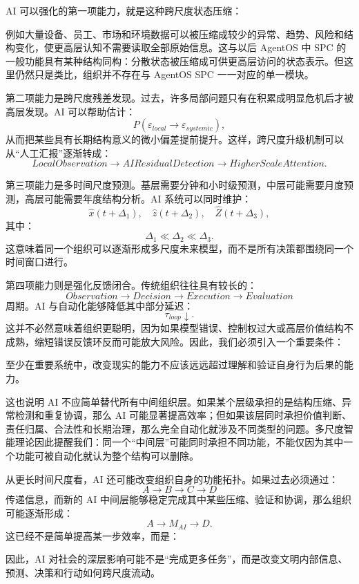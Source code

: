 AI 可以强化的第一项能力，就是这种跨尺度状态压缩：
\begin{statementbox}
\centering
{}
\end{statementbox}
例如大量设备、员工、市场和环境数据可以被压缩成较少的异常、趋势、风险和结构变化，使更高层认知不需要读取全部原始信息。这与以后 AgentOS 中 SPC 的一般功能具有某种结构同构：分散状态被压缩成可供更高层访问的状态表示。但这里仍然只是类比，组织并不存在与 AgentOS SPC 一一对应的单一模块。

第二项能力是跨尺度残差发现。过去，许多局部问题只有在积累成明显危机后才被高层发现。AI 可以帮助估计：
\[
P
\left(
\varepsilon_{local}
\rightarrow
\varepsilon_{systemic}
\right),
\]
从而把某些具有长期结构意义的微小偏差提前提升。这样，跨尺度升级机制可以从“人工汇报”逐渐转成：
\[
LocalObservation
\rightarrow
AIResidualDetection
\rightarrow
HigherScaleAttention.
\]

第三项能力是多时间尺度预测。基层需要分钟和小时级预测，中层可能需要月度预测，高层可能需要年度结构分析。AI 系统可以同时维护：
\[
\hat x(t+\Delta_1),
\quad
\hat z(t+\Delta_2),
\quad
\hat Z(t+\Delta_3),
\]
其中：
\[
\Delta_1
\ll
\Delta_2
\ll
\Delta_3.
\]
这意味着同一个组织可以逐渐形成多尺度未来模型，而不是所有决策都围绕同一个时间窗口进行。

第四项能力则是强化反馈闭合。传统组织往往具有较长的：
\[
Observation
\rightarrow
Decision
\rightarrow
Execution
\rightarrow
Evaluation
\]
周期。AI 与自动化能够降低其中部分延迟：
\[
\tau_{loop}\downarrow.
\]
这并不必然意味着组织更聪明，因为如果模型错误、控制权过大或高层价值结构不成熟，缩短错误反馈环反而可能放大风险。因此，我们必须引入一个重要条件：
\begin{statementbox}
\centering
{}
\end{statementbox}
至少在重要系统中，改变现实的能力不应该远远超过理解和验证自身行为后果的能力。

这也说明 AI 不应简单替代所有中间组织层。如果某个层级承担的是结构压缩、异常检测和重复协调，那么 AI 可能显著提高效率；但如果该层同时承担价值判断、责任归属、合法性和长期治理，那么完全自动化就涉及不同类型的问题。多尺度智能理论因此提醒我们：同一个“中间层”可能同时承担不同功能，不能仅因为其中一个功能可被自动化就认为整个结构可以删除。

从更长时间尺度看，AI 还可能改变组织自身的功能拓扑。如果过去必须通过：
\[
A\rightarrow B\rightarrow C\rightarrow D
\]
传递信息，而新的 AI 中间层能够稳定完成其中某些压缩、验证和协调，那么组织可能逐渐形成：
\[
A\rightarrow M_{AI}\rightarrow D.
\]
这已经不是简单提高某一步效率，而是：
\begin{statementbox}
\centering
{}
\end{statementbox}
因此，AI 对社会的深层影响可能不是“完成更多任务”，而是改变文明内部信息、预测、决策和行动如何跨尺度流动。

